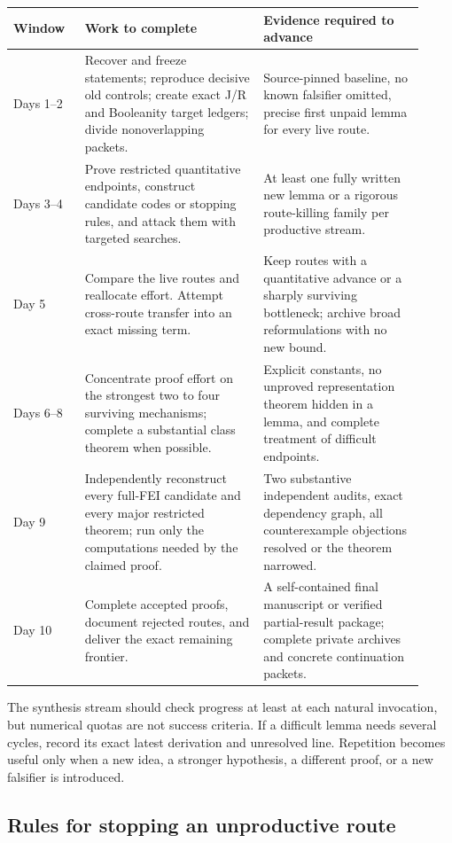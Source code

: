 \documentclass[11pt]{article}
\begin{document}
\begin{longtable}{>{\raggedright\arraybackslash}p{0.16\linewidth}>{\raggedright\arraybackslash}p{0.40\linewidth}>{\raggedright\arraybackslash}p{0.36\linewidth}}
\toprule
Window & Work to complete & Evidence required to advance \\
\midrule\endhead
Days 1--2 & Recover and freeze statements; reproduce decisive old controls; create exact J/R and Booleanity target ledgers; divide nonoverlapping packets. & Source-pinned baseline, no known falsifier omitted, precise first unpaid lemma for every live route. \\
Days 3--4 & Prove restricted quantitative endpoints, construct candidate codes or stopping rules, and attack them with targeted searches. & At least one fully written new lemma or a rigorous route-killing family per productive stream. \\
Day 5 & Compare the live routes and reallocate effort. Attempt cross-route transfer into an exact missing term. & Keep routes with a quantitative advance or a sharply surviving bottleneck; archive broad reformulations with no new bound. \\
Days 6--8 & Concentrate proof effort on the strongest two to four surviving mechanisms; complete a substantial class theorem when possible. & Explicit constants, no unproved representation theorem hidden in a lemma, and complete treatment of difficult endpoints. \\
Day 9 & Independently reconstruct every full-FEI candidate and every major restricted theorem; run only the computations needed by the claimed proof. & Two substantive independent audits, exact dependency graph, all counterexample objections resolved or the theorem narrowed. \\
Day 10 & Complete accepted proofs, document rejected routes, and deliver the exact remaining frontier. & A self-contained final manuscript or verified partial-result package; complete private archives and concrete continuation packets. \\
\bottomrule
\end{longtable}

The synthesis stream should check progress at least at each natural invocation, but numerical quotas are not success criteria. If a difficult lemma needs several cycles, record its exact latest derivation and unresolved line. Repetition becomes useful only when a new idea, a stronger hypothesis, a different proof, or a new falsifier is introduced.

\subsection{Rules for stopping an unproductive route}
\end{document}
